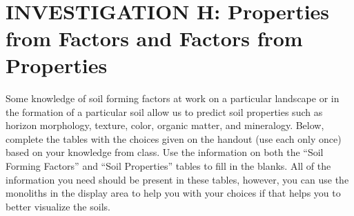 \documentclass[
  letterpaper,
  twocolumn,
  portrait]{scrbook}
\begin{document}
~ ~ ~

\hypertarget{investigation-h-properties-from-factors-and-factors-from-properties}{%
\section{INVESTIGATION H: Properties from Factors and Factors from
Properties}\label{investigation-h-properties-from-factors-and-factors-from-properties}}

Some knowledge of soil forming factors at work on a particular landscape
or in the formation of a particular soil allow us to predict soil
properties such as horizon morphology, texture, color, organic matter,
and mineralogy. Below, complete the tables with the choices given on the
handout (use each only once) based on your knowledge from class. Use the
information on both the ``Soil Forming Factors'' and ``Soil Properties''
tables to fill in the blanks. All of the information you need should be
present in these tables, however, you can use the monoliths in the
display area to help you with your choices if that helps you to better
visualize the soils.

 
  \providecommand{\huxb}[2]{\arrayrulecolor[RGB]{#1}\global\arrayrulewidth=#2pt}
  \providecommand{\huxvb}[2]{\color[RGB]{#1}\vrule width #2pt}
  \providecommand{\huxtpad}[1]{\rule{0pt}{#1}}
  \providecommand{\huxbpad}[1]{\rule[-#1]{0pt}{#1}}
\end{document}
